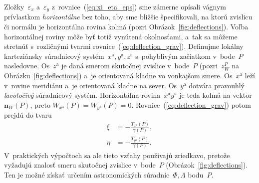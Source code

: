 \documentclass[a4paper, 12pt]{book}
\let\vec\mathbf
\begin{document}
Zložky~$\varepsilon_x$ a~$\varepsilon_y$ z~rovnice~(\ref{eq:xi_eta_eps}) sme 
zámerne opísali vágnym prívlastkom \emph{horizontálne} bez toho, aby sme 
bližšie špecifikovali, na ktorú zvislicu či normálu je horizontálna rovina 
kolmá (pozri Obrázok~\ref{fig:deflections}).  Voľba horizontálnej roviny môže 
byť totiž vynútená okolnosťami, a~tak sa môžeme stretnúť s~rozličnými tvarmi 
rovnice~(\ref{eq:deflection_grav}).  Definujme lokálny karteziánsky súradnicový 
systém~$x^\mathrm{a}, y^\mathrm{a}, z^\mathrm{a}$ s~pohyblivým začiatkom 
v~bode~$P$ nasledovne.  Os~$z^\mathrm{a}$ je daná smerom skutočnej zvislice 
v~bode~$P$ (pozri~$z_W^P$ na Obrázku~\ref{fig:deflections}) a~je orientovaná 
kladne vo vonkajšom smere.  Os~$x^\mathrm{a}$ leží v~rovine meridiánu a~je 
orientovaná kladne na sever.  Os~$y^\mathrm{a}$ dotvára pravouhlý 
\emph{ľavotočivý} súradnicový systém.  Horizontálna 
rovina~$x^\mathrm{a}y^\mathrm{a}$ je teda kolmá na vektor~$\vec n_W(P)$, preto 
$W_{x^\mathrm{a}}(P) = W_{y^\mathrm{a}}(P) = 0$.  
Rovnice~(\ref{eq:deflection_grav}) potom prejdú do tvaru 
\parencite{Borre_chapter4}
%
\begin{equation}
\label{eq:deflection_grav_nat}
\begin{split}
\xi &= -\frac{T_{x^\mathrm{a}}(P)}{\gamma(P)}{,}\\
%
\eta &= -\frac{T_{y^\mathrm{a}}(P)}{\gamma(P)}{.}
\end{split}
\end{equation}
%
V~praktických výpočtoch sa ale tieto vzťahy použivajú zriedkavo, pretože 
vyžadujú znalosť smeru skutočnej zvislice v~bode~$P$ 
(Obrázok~\ref{fig:deflections}).  Ten je možné získať určením astronomických 
súradníc~$\Phi, \Lambda$ bodu~$P$.
\end{document}

